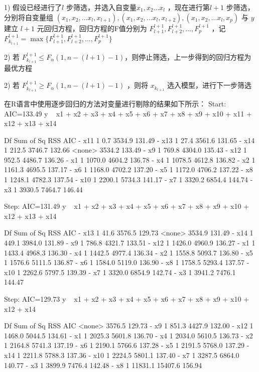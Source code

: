 \documentclass [a4paper]{article}
\begin{document}
1) 假设已经进行了$l$ 步筛选，并选入自变量$x_1,x_2...x_l$ ，现在进行第$l+1$ 步筛选，分别将自变量组 $(x_1,x_2,...x_l,x_{l+1}),(x_1,x_2,...x_l,x_{l+2}),(x_1,x_2,...x_l,x_{p})$ 与 $y$ 建立 $l+1$ 元回归方程，回归方程的F值分别为 ${F_{l+1}^{l+1},F_{l+2}^{l+1},...,F_p^{l+1}}$ ，记$F_{k_{l+1}}^{l+1} = \max\{ F_{l+1}^{l+1},F_{l+2}^{l+1},...,F_p^{l+1}\}$

2) 若 $F_{k_{l+1}}^{l+1} \le F_\alpha(1,n-(l+1)-1)$，则停止筛选，上一步得到的回归方程为最优方程

2) 若 $F_{k_{l+1}}^{l+1} \ge F_\alpha(1,n-(l+1)-1)$ ，则将 $x_{k_{l+1}}$ 选入模型，进行下一步筛选

在R语言中使用逐步回归的方法对变量进行剔除的结果如下所示：
Start:  AIC=133.49
y ~ x1 + x2 + x3 + x4 + x5 + x6 + x7 + x8 + x9 + x10 + x11 +
    x12 + x13 + x14

       Df Sum of Sq    RSS    AIC
- x11   1       0.7 3534.9 131.49
- x13   1      27.4 3561.6 131.65
- x14   1     212.5 3746.7 132.66
<none>              3534.2 133.49
- x9    1     769.8 4304.0 135.43
- x12   1     952.5 4486.7 136.26
- x1    1    1070.0 4604.2 136.78
- x4    1    1078.5 4612.8 136.82
- x2    1    1161.3 4695.5 137.17
- x6    1    1168.0 4702.2 137.20
- x5    1    1172.0 4706.2 137.22
- x8    1    1248.1 4782.3 137.54
- x10   1    2200.1 5734.3 141.17
- x7    1    3320.2 6854.4 144.74
- x3    1    3930.5 7464.7 146.44

Step:  AIC=131.49
y ~ x1 + x2 + x3 + x4 + x5 + x6 + x7 + x8 + x9 + x10 + x12 +
    x13 + x14

       Df Sum of Sq    RSS    AIC
- x13   1      41.6 3576.5 129.73
<none>              3534.9 131.49
- x14   1     449.1 3984.0 131.89
- x9    1     786.8 4321.7 133.51
- x12   1    1426.0 4960.9 136.27
- x1    1    1433.4 4968.3 136.30
- x4    1    1442.5 4977.4 136.34
- x2    1    1558.8 5093.7 136.80
- x5    1    1576.6 5111.5 136.87
- x6    1    1584.0 5119.0 136.90
- x8    1    1758.5 5293.4 137.57
- x10   1    2262.6 5797.5 139.39
- x7    1    3320.0 6854.9 142.74
- x3    1    3941.2 7476.1 144.47

Step:  AIC=129.73
y ~ x1 + x2 + x3 + x4 + x5 + x6 + x7 + x8 + x9 + x10 + x12 +
    x14

       Df Sum of Sq     RSS    AIC
<none>               3576.5 129.73
- x9    1     851.3  4427.9 132.00
- x12   1    1468.0  5044.5 134.61
- x1    1    2025.3  5601.8 136.70
- x4    1    2034.0  5610.5 136.73
- x2    1    2164.8  5741.3 137.19
- x6    1    2190.1  5766.6 137.28
- x5    1    2191.5  5768.0 137.29
- x14   1    2211.8  5788.3 137.36
- x10   1    2224.5  5801.1 137.40
- x7    1    3287.5  6864.0 140.77
- x3    1    3899.9  7476.4 142.48
- x8    1   11831.1 15407.6 156.94
\end{document}
